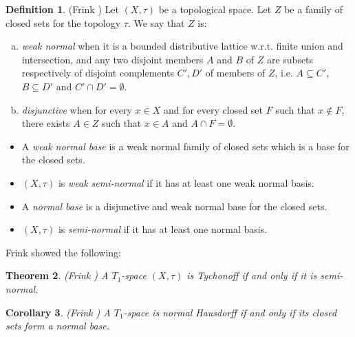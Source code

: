 \documentclass{article}
\theoremstyle{plain}
\newtheorem{theorem}{Theorem}[subsection]
\newtheorem{corollary}[theorem]{Corollary}
\theoremstyle{definition}
\newtheorem{definition}[theorem]{Definition}
\theoremstyle{remark}
\newcommand{\0}{\mathbbm 0}
\newcommand{\1}{\mathbbm 1}
\newcommand{\2}{\mathbbm 2}
\begin{document}
\begin{definition}(Frink \cite{frink})
\label{def:normalbasis}
    Let $(X, \tau)$ be a topological space. Let $Z$ be a family of closed sets for the topology $\tau$. We say that $Z$ is: 
\begin{enumerate}[(a)]\label{def:normalbasis-weak-normal}
        
        \item \emph{weak normal} when it is a bounded distributive lattice w.r.t. finite union and intersection, and any two disjoint members $A$ and $B$ of $Z$ are subsets respectively of disjoint complements $C',D'$ of members of $Z$, i.e. $A \subseteq C'$, $B \subseteq D'$ and $C' \cap D'=\emptyset$.

\item \label{def:normalbasis-disjunctive} \emph{disjunctive} when for every $x \in X$ and for every closed set $F$ such that $x \notin F$, there exists $A \in Z$ such that $x \in A$ and $A \cap F= \emptyset$.
 \end{enumerate}

\begin{itemize}\label{def:normalbasis-weaknormalbase}
\item
A \emph{weak normal base} is a weak normal family of closed sets which is a base for the closed sets.
\item \label{def:normalbasis-weakseminormal}
$(X, \tau)$  is \emph{weak semi-normal} if it has at least one weak normal basis. 



\item\label{def:normalbasis-normalbase}
A \emph{normal base} is a disjunctive and weak normal base for the closed sets.
\item \label{def:normalbasis-seminormal}
$(X, \tau)$  is \emph{semi-normal} if it has at least one normal basis. 
\end{itemize}
\end{definition}

Frink showed the following:
\begin{theorem}(Frink \cite{frink})
\label{thm:tychonoffiffseminormal}
   A $T_1$-space $(X, \tau)$ is Tychonoff if and only if it is semi-normal.  
\end{theorem}

\begin{corollary}(Frink \cite{frink})
\label{cor:normal&Frink}
    A $T_1$-space is normal Hausdorff if and only if its closed sets form a normal base.
\end{corollary}
\end{document}
